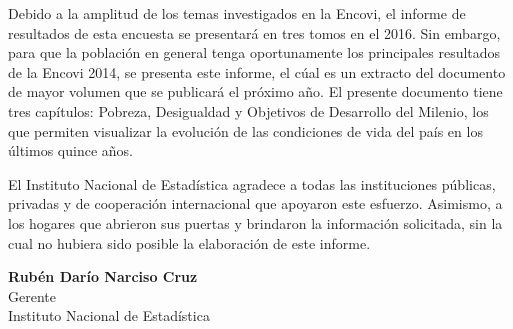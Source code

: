 Debido a la amplitud de los temas investigados en la Encovi, el informe de resultados de esta encuesta se presentará en tres tomos en el 2016. Sin embargo, para que la población en general tenga oportunamente    los principales resultados de la Encovi 2014, se presenta este informe, el cúal es un extracto del documento de mayor volumen que se publicará el próximo año.  El presente documento tiene tres capítulos: Pobreza, Desigualdad y Objetivos de Desarrollo del Milenio, los que permiten visualizar la evolución de las condiciones de vida del país en los últimos quince años. 


El Instituto Nacional de Estadística agradece a todas las instituciones públicas, privadas y de cooperación internacional que apoyaron este esfuerzo. Asimismo, a los hogares que abrieron sus puertas y  brindaron  la información  solicitada, sin la cual no hubiera sido posible  la elaboración de este informe.\\[1cm] 


\begin{center}
	\textbf{Rubén Darío Narciso Cruz}\\
	Gerente\\
	Instituto Nacional de Estadística
\end{center}

\cleardoublepage
